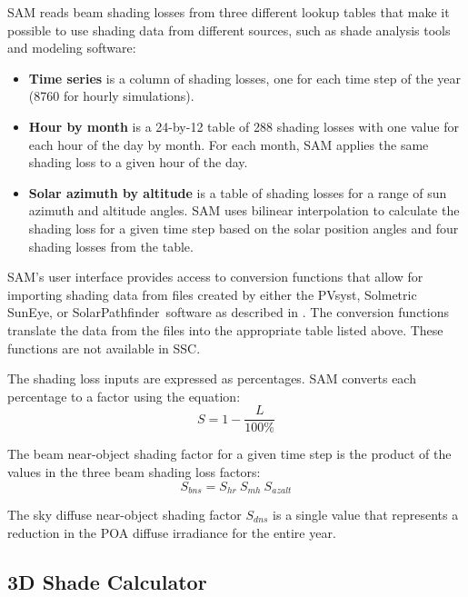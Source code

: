 \documentclass[12pt,letterpaper]{article}
\begin{document}
SAM reads beam shading losses from three different lookup tables that make it possible to use shading data from different sources, such as shade analysis tools and modeling software:
\begin{itemize} 
\item \textbf{Time series} is a column of shading losses, one for each time step of the year (8760 for hourly simulations).
\item \textbf{Hour by month} is a 24-by-12 table of 288 shading losses with one value for each hour of the day by month. For each month, SAM applies the same shading loss to a given hour of the day.
\item \textbf{Solar azimuth by altitude} is a table of shading losses for a range of sun azimuth and altitude angles. SAM uses bilinear interpolation to calculate the shading loss for a given time step based on the solar position angles and four shading losses from the table.
\end{itemize}

SAM's user interface provides access to conversion functions that allow for importing shading data from files created by either the PVsyst, Solmetric SunEye, or SolarPathfinder\texttrademark~software as described in \citet{help-shading}. The conversion functions translate the data from the files into the appropriate table listed above. These functions are not available in SSC.

The shading loss inputs are expressed as percentages. SAM converts each percentage to a factor using the equation:
\begin{equation}
S=1-\frac{L}{100\%}
\end{equation}

The beam near-object shading factor for a given time step is the product of the values in the three beam shading loss factors:
\begin{equation}\label{eqn-sbns}
S_{bns}=S_{hr}~S_{mh}~S_{azalt}
\end{equation}

The sky diffuse near-object shading factor $S_{dns}$ is a single value that represents a reduction in the POA diffuse irradiance for the entire year.

\subsection{3D Shade Calculator}\label{sec-3dshad}
\end{document}
